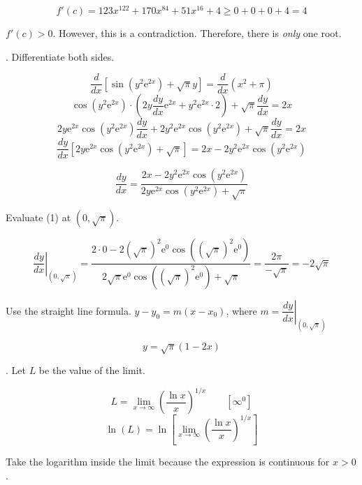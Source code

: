 \documentclass{article}
\begin{document}
\[f'(c) = 123x^{122}+170x^{84} + 51x^{16} + 4 \geq 0+ 0+ 0+ 4 = 4\]

\hfill

\noindent $f'(c)>0$. However, this is a contradiction. Therefore, there is \textit{only} one root.

\hfill

. Differentiate both sides.

\[\frac d{dx}\left[\sin(y^2\mathrm{e}^{2x})+\sqrt\pi y\right]=\frac{d}{dx}\left(x^2+\pi\right)\]
\[\cos\left(y^2\mathrm{e}^{2x}\right)\cdot\left(2y{\frac{dy}{dx}\mathrm{e}^{2x}}+y^2\mathrm{e}^{2x}\cdot2\right)+\sqrt\pi\frac{dy}{dx}=2x\]
\[2y{\mathrm{e}^{2x}}\cos\left(y^2\mathrm{e}^{2x}\right)\frac{dy}{dx}+2y^2\mathrm{e}^{2x}\cos\left(y^2\mathrm{e}^{2x}\right)+\sqrt\pi\frac{dy}{dx}=2x\]
\[\frac{dy}{dx}\left[2y\mathrm{e}^{2x}\cos\left(y^2\mathrm{e}^{2x}\right)+\sqrt\pi\right]=2x-2y^2{\mathrm{e}^{2x}}\cos\left(y^2\mathrm{e}^{2x}\right)\]

\begin{equation}\frac{dy}{dx}=\frac{2x-2y^2{\mathrm{e}^{2x}}\cos\left(y^2\mathrm{e}^{2x}\right)}{2y\mathrm{e}^{2x}\cos\left(y^2\mathrm{e}^{2x}\right)+\sqrt\pi}\end{equation}

\hfill

\noindent Evaluate (1) at $\left(0, \sqrt\pi\right)$.

\[\left.\frac{dy}{dx}\right|_{\left(0, \sqrt\pi\right)}=\frac{2\cdot0-2\left(\sqrt\pi\right)^2{\mathrm{e}^{0}}\cos\left(\left(\sqrt\pi\right)^2\mathrm{e}^{0}\right)}{2\sqrt\pi\mathrm{e}^{0}\cos\left(\left(\sqrt\pi\right)^2\mathrm{e}^{0}\right)+\sqrt\pi}=\frac{2\pi}{-\sqrt\pi}=-2\sqrt\pi\]

\hfill

\noindent Use the straight line formula. $y-y_0=m(x-x_0)$, where $m=\left.\dfrac{dy}{dx}\right|_{\left(0,\sqrt\pi\right)}$

\[\boxed{y=\sqrt\pi(1-2x)}\]

\hfill

. Let $L$ be the value of the limit.

\[L=\lim_{x\to\infty}\left(\frac{\ln x}x\right)^{1/x}\qquad\left[\infty^0\right]\]
\[\ln(L)=\ln\left[\lim_{x\to\infty}\left(\frac{\ln x}x\right)^{1/x}\right]\]

\hfill

\noindent Take the logarithm inside the limit because the expression is continuous for $x>0$.
\end{document}
